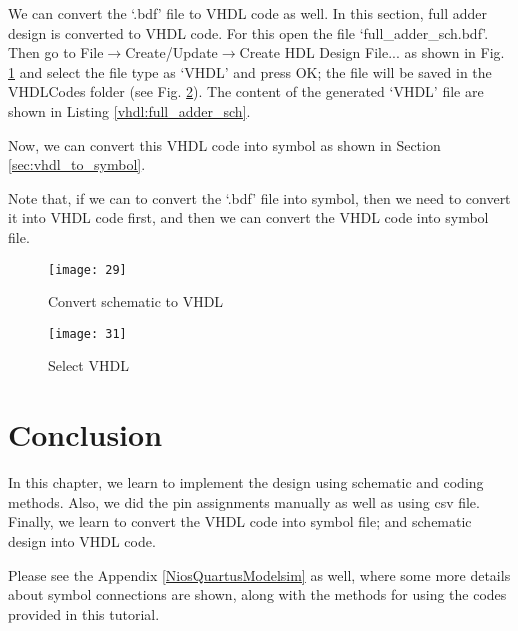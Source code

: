 We can convert the `.bdf' file to VHDL code as well. In this section, full adder design is converted to VHDL code. For this open the file `full\_adder\_sch.bdf'. Then go to File$\rightarrow$Create/Update$\rightarrow$Create HDL Design File... as shown in Fig. \ref{fig:bdf_to_vhdl} and select the file type as `VHDL' and press OK; the file will be saved in the VHDLCodes folder (see Fig. \ref{fig:to_vhdl}). The content of the generated `VHDL' file are shown in Listing \ref{vhdl:full_adder_sch}. 

Now, we can convert this VHDL code into symbol as shown in Section \ref{sec:vhdl_to_symbol}. 

\begin{noNumBox}
	Note that, if we can to convert the `.bdf' file into symbol, then we need to convert it into VHDL code first, and then we can convert the VHDL code into symbol file. 
\end{noNumBox}

	\begin{figure}[!h]
		\centering
		\texttt{[image: 29]}
		\caption{Convert schematic to VHDL}
		\label{fig:bdf_to_vhdl}
	\end{figure}


	\begin{figure}[!h]
		\centering
		\texttt{[image: 31]}
		\caption{Select VHDL}
		\label{fig:to_vhdl}
	\end{figure}



\section{Conclusion}
In this chapter, we learn to implement the design using schematic and coding methods. Also, we did the pin assignments manually as well as using csv file. Finally, we learn to convert the VHDL code into symbol file; and schematic design into VHDL code. 

\begin{noNumBox}
	Please see the Appendix \ref{NiosQuartusModelsim}  as well, where some more details about symbol connections are shown, along with the methods for using the codes provided in this tutorial. 
\end{noNumBox}

